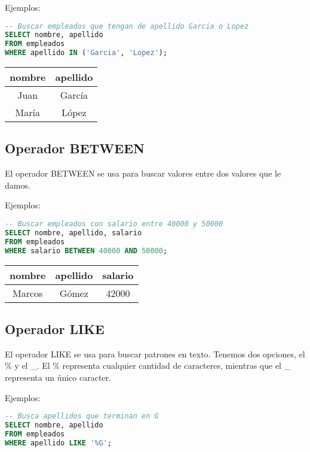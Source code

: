 \documentclass[12pt]{article}
\begin{document}
\vspace{1em}

Ejemplos:
\begin{lstlisting}[language=SQL]
-- Buscar empleados que tengan de apellido Garcia o Lopez
SELECT nombre, apellido
FROM empleados
WHERE apellido IN ('Garcia', 'Lopez');
\end{lstlisting}

\begin{center}
\begin{tabular}{cc}
\toprule
nombre & apellido \\
\midrule
Juan & García \\
María & López \\
\bottomrule
\end{tabular}
\end{center}

\subsection{Operador BETWEEN}
El operador BETWEEN se usa para buscar valores entre dos valores que le damos.

\vspace{1em}

Ejemplos:
\begin{lstlisting}[language=SQL]
-- Buscar empleados con salario entre 40000 y 50000
SELECT nombre, apellido, salario
FROM empleados
WHERE salario BETWEEN 40000 AND 50000;
\end{lstlisting}

\begin{center}
\begin{tabular}{ccc}
\toprule
nombre & apellido & salario \\
\midrule
Marcos & Gómez & 42000 \\
\bottomrule
\end{tabular}
\end{center}

\subsection{Operador LIKE}
El operador LIKE se usa para buscar patrones en texto. Tenemos dos opciones, el \% y el \_. El \% representa cualquier cantidad de caracteres, mientras que el \_ representa un único caracter.

Ejemplos:
\begin{lstlisting}[language=SQL]
-- Busca apellidos que terminan en G
SELECT nombre, apellido
FROM empleados
WHERE apellido LIKE '%G';
\end{lstlisting}
\end{document}
